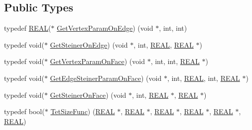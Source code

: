 \subsection*{Public Types}
\begin{DoxyCompactItemize}
\item 
typedef \hyperlink{tetgen_8h_a4b654506f18b8bfd61ad2a29a7e38c25}{R\+E\+AL}($\ast$ \hyperlink{classtetgenio_a9b66695edca7918733cccf3e44c95e3d}{Get\+Vertex\+Param\+On\+Edge}) (void $\ast$, int, int)
\item 
typedef void($\ast$ \hyperlink{classtetgenio_a1c16b3a4c3d5a0166f989fa62a0ea575}{Get\+Steiner\+On\+Edge}) (void $\ast$, int, \hyperlink{tetgen_8h_a4b654506f18b8bfd61ad2a29a7e38c25}{R\+E\+AL}, \hyperlink{tetgen_8h_a4b654506f18b8bfd61ad2a29a7e38c25}{R\+E\+AL} $\ast$)
\item 
typedef void($\ast$ \hyperlink{classtetgenio_a331721b37f6937630548cb659642f926}{Get\+Vertex\+Param\+On\+Face}) (void $\ast$, int, int, \hyperlink{tetgen_8h_a4b654506f18b8bfd61ad2a29a7e38c25}{R\+E\+AL} $\ast$)
\item 
typedef void($\ast$ \hyperlink{classtetgenio_ad0078621198b377323d048cbcb2fe276}{Get\+Edge\+Steiner\+Param\+On\+Face}) (void $\ast$, int, \hyperlink{tetgen_8h_a4b654506f18b8bfd61ad2a29a7e38c25}{R\+E\+AL}, int, \hyperlink{tetgen_8h_a4b654506f18b8bfd61ad2a29a7e38c25}{R\+E\+AL} $\ast$)
\item 
typedef void($\ast$ \hyperlink{classtetgenio_a3e77872e867758e38d5682a3042119d2}{Get\+Steiner\+On\+Face}) (void $\ast$, int, \hyperlink{tetgen_8h_a4b654506f18b8bfd61ad2a29a7e38c25}{R\+E\+AL} $\ast$, \hyperlink{tetgen_8h_a4b654506f18b8bfd61ad2a29a7e38c25}{R\+E\+AL} $\ast$)
\item 
typedef bool($\ast$ \hyperlink{classtetgenio_a9be33b16e8ace07e123954b4f10629e5}{Tet\+Size\+Func}) (\hyperlink{tetgen_8h_a4b654506f18b8bfd61ad2a29a7e38c25}{R\+E\+AL} $\ast$, \hyperlink{tetgen_8h_a4b654506f18b8bfd61ad2a29a7e38c25}{R\+E\+AL} $\ast$, \hyperlink{tetgen_8h_a4b654506f18b8bfd61ad2a29a7e38c25}{R\+E\+AL} $\ast$, \hyperlink{tetgen_8h_a4b654506f18b8bfd61ad2a29a7e38c25}{R\+E\+AL} $\ast$, \hyperlink{tetgen_8h_a4b654506f18b8bfd61ad2a29a7e38c25}{R\+E\+AL} $\ast$, \hyperlink{tetgen_8h_a4b654506f18b8bfd61ad2a29a7e38c25}{R\+E\+AL})
\end{DoxyCompactItemize}
